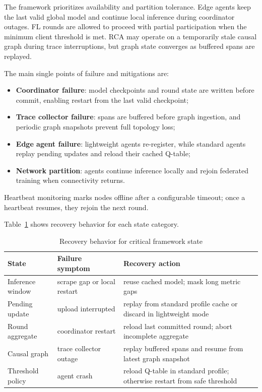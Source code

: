The framework prioritizes availability and partition tolerance. Edge agents keep
the last valid global model and continue local inference during coordinator
outages. FL rounds are allowed to proceed with partial participation when the
minimum client threshold is met. RCA may operate on a temporarily stale causal
graph during trace interruptions, but graph state converges as buffered spans are
replayed.

The main single points of failure and mitigations are:

\begin{itemize}
    \item \textbf{Coordinator failure}: model checkpoints and round state are
    written before commit, enabling restart from the last valid checkpoint;
    \item \textbf{Trace collector failure}: spans are buffered before graph
    ingestion, and periodic graph snapshots prevent full topology loss;
    \item \textbf{Edge agent failure}: lightweight agents re-register, while
    standard agents replay pending updates and reload their cached Q-table;
    \item \textbf{Network partition}: agents continue inference locally and
    rejoin federated training when connectivity returns.
\end{itemize}

Heartbeat monitoring marks nodes offline after a configurable timeout; once a
heartbeat resumes, they rejoin the next round.

Table~\ref{tab:recovery_behavior} shows recovery behavior for each state
category.

\begin{table}[H]
    \centering
    \small
    \begin{tabular}{|p{}|p{}|p{}|}
        \hline
        \textbf{State} & \textbf{Failure symptom} & \textbf{Recovery action} \\
        \hline
        Inference window & scrape gap or local restart & reuse cached model;
        mask long metric gaps \\
        \hline
        Pending update & upload interrupted & replay from standard profile
        cache or discard in lightweight mode \\
        \hline
        Round aggregate & coordinator restart & reload last committed round;
        abort incomplete aggregate \\
        \hline
        Causal graph & trace collector outage & replay buffered spans and
        resume from latest graph snapshot \\
        \hline
        Threshold policy & agent crash & reload Q-table in standard profile;
        otherwise restart from safe threshold \\
        \hline
    \end{tabular}
    \caption{Recovery behavior for critical framework state}
    \label{tab:recovery_behavior}
\end{table}

